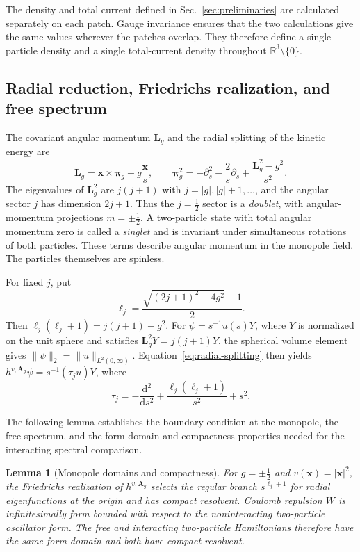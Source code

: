 \documentclass[11pt,a4paper]{article}
\newtheorem{lemma}[theorem]{Lemma}
\theoremstyle{remark}
\theoremstyle{plain}
\newcommand{\R}{\mathbb R}
\newcommand{\A}{\mathbf A}
\newcommand{\bpi}{\boldsymbol\pi}
\begin{document}
The density and total current defined in Sec.~\ref{sec:preliminaries}
are calculated separately on each patch. Gauge invariance ensures that the two
calculations give the same values wherever the patches overlap.
They therefore define a single particle density and a single
total-current density throughout $\R^3\setminus\{0\}$.

\subsection{Radial reduction, Friedrichs realization, and free spectrum}
\label{sec:monopole-spectrum}
\label{app:monopole-domains}

The covariant angular momentum $\mathbf L_g$ and the radial splitting
of the kinetic energy are
\begin{equation}
 \mathbf L_g=\mathbf x\times\bpi_g+g\frac{\mathbf x}{s},\qquad
 \bpi_g^2=-\partial_s^2-\frac2s\partial_s
                   +\frac{\mathbf L_g^2-g^2}{s^2}.
 \label{eq:radial-splitting}
\end{equation}
The eigenvalues of $\mathbf L_g^2$ are $j(j+1)$ with
$j=|g|,|g|+1,\ldots$, and the angular sector $j$ has dimension $2j+1$.
Thus the $j=\tfrac12$ sector is a \emph{doublet}, with
angular-momentum projections $m=\pm\tfrac12$.
A two-particle state with total angular momentum zero is
called a \emph{singlet} and is invariant under simultaneous
rotations of both particles. These terms describe angular
momentum in the monopole field. The particles themselves
are spinless.

For fixed $j$, put
\begin{equation}
 \ell_j=\frac{\sqrt{(2j+1)^2-4g^2}-1}{2}.
\end{equation}
Then $\ell_j(\ell_j+1)=j(j+1)-g^2$.
For $\psi=s^{-1}u(s)Y$, where $Y$ is normalized on the unit
sphere and satisfies $\mathbf L_g^2Y=j(j+1)Y$, the spherical
volume element gives $\|\psi\|_2=\|u\|_{L^2(0,\infty)}$.
Equation~\eqref{eq:radial-splitting} then yields
$h^{v,\A_g}\psi=s^{-1}(\tau_j u)Y$,
where
\begin{equation}
 \tau_j=-\frac{\mathrm{d}^2}{\mathrm{d}s^2}+\frac{\ell_j(\ell_j+1)}{s^2}+s^2.
 \label{eq:monopole-radial}
\end{equation}

The following lemma establishes the boundary condition at the
monopole, the free spectrum, and the form-domain and compactness
properties needed for the interacting spectral comparison.

\begin{lemma}[Monopole domains and compactness]
\label{lem:monopole-domains}
For $g=\pm\tfrac12$ and $v(\mathbf x)=|\mathbf x|^2$, the
Friedrichs realization of $h^{v,\A_g}$ selects the regular branch
$s^{\ell_j+1}$ for radial eigenfunctions at the origin and has
compact resolvent. Coulomb repulsion $W$ is infinitesimally form
bounded with respect to the noninteracting two-particle oscillator
form. The free and interacting two-particle Hamiltonians therefore
have the same form domain and both have compact resolvent.
\end{lemma}
\end{document}
